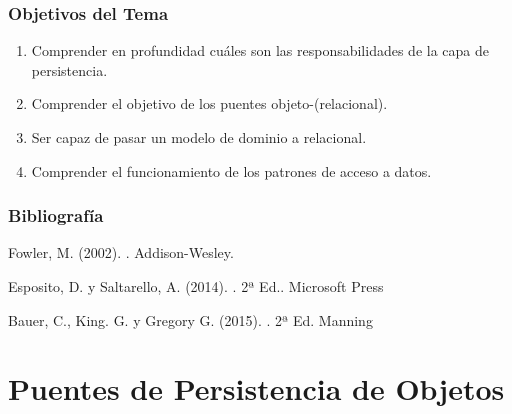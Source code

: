 \documentclass[a4paper,slidestop,xcolor=pst,blue]{beamer}
\begin{document}
\begin{frame}[c]
    \frametitle{Objetivos del Tema}
    \begin{enumerate}[<+->]
         \item Comprender en profundidad cuáles son las responsabilidades de la capa de persistencia.
         \item Comprender el objetivo de los puentes objeto-(relacional).
         \item Ser capaz de pasar un modelo de dominio a relacional.
         \item Comprender el funcionamiento de los patrones de acceso a datos.
    \end{enumerate}
\end{frame}

\begin{frame}[c]
    \frametitle{Bibliografía}
    \begin{thebibliography}{1}

        Fowler, M. (2002).
        .
        \newblock Addison-Wesley.

        Esposito, D. y Saltarello, A. (2014).
        . 2ª Ed..
        \newblock Microsoft Press

        Bauer, C., King. G. y Gregory G. (2015).
        . 2ª Ed.
        \newblock Manning


    \end{thebibliography}
\end{frame}


\section{Puentes de Persistencia de Objetos}
\end{document}
